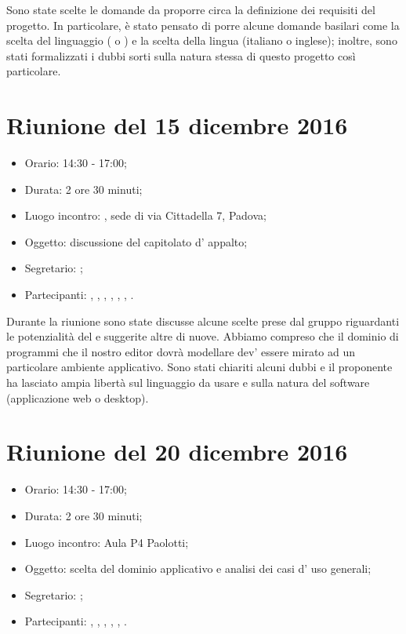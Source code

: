Sono state scelte le domande da proporre circa la definizione dei requisiti del progetto. In particolare, è stato pensato di porre alcune domande basilari come la scelta del linguaggio ( o ) e la scelta della lingua (italiano o inglese); inoltre, sono stati formalizzati i dubbi sorti sulla natura stessa di questo progetto così particolare.



\section{Riunione del 15 dicembre 2016}

\begin{itemize}
	\item Orario: 14:30 - 17:00;
	\item Durata: 2 ore 30 minuti;
	\item Luogo incontro: \ZU, sede di via Cittadella 7, Padova; 
	\item Oggetto: discussione del capitolato d' appalto;
	\item Segretario: \LS; 
	\item Partecipanti: \GP, \AZ, \GG, \LB, \LS, \MM, \PB.
\end{itemize}

Durante la riunione sono state discusse alcune scelte prese dal gruppo riguardanti le potenzialità del  e suggerite altre di nuove. Abbiamo compreso che il dominio di programmi  che il nostro editor dovrà modellare dev' essere mirato ad un particolare ambiente applicativo. Sono stati chiariti alcuni dubbi e il proponente ha lasciato ampia libertà sul linguaggio da usare e sulla natura del software (applicazione web o desktop).



\section{Riunione del 20 dicembre 2016}

\begin{itemize}
	\item Orario: 14:30 - 17:00;
	\item Durata: 2 ore 30 minuti;
	\item Luogo incontro: Aula P4 Paolotti; 
	\item Oggetto: scelta del dominio applicativo e analisi dei casi d' uso generali;
	\item Segretario: \PB; 
	\item Partecipanti: \AZ, \GG, \LB, \LS, \MM, \PB.
\end{itemize}

